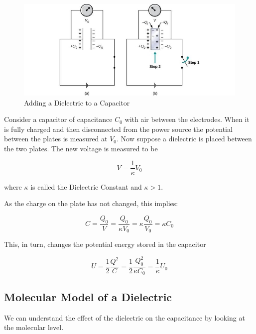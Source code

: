 \documentclass[14pt]{memoir}
\begin{document}
\begin{figure}[H]
\begin{center}
\includegraphics[scale=0.50]{fig/fig_08_17.jpg}
\caption{Adding a Dielectric to a Capacitor}
\label{fig:08_17}
\end{center}
\end{figure}


Consider a capacitor of capacitance $C_0$ with air between the electrodes. When it is fully charged and then disconnected from the power source the potential between the plates is measured at $V_0$. Now suppose a dielectric is placed between the two plates. The new voltage is measured to be

\begin{equation}
V = \frac{1}{\kappa} V_0
\end{equation}

where $\kappa$ is called the Dielectric Constant and $\kappa > 1$.

As the charge on the plate has not changed, this implies:

\begin{equation}
C = \frac{Q_0}{V} = \frac{Q_0}{\kappa V_0} = \kappa \frac{Q_0}{V_0} = \kappa C_0
\end{equation}

This, in turn, changes the potential energy stored in the capacitor

\begin{equation}
U = \frac{1}{2} \frac{Q^2}{C} = \frac{1}{2} \frac{Q_0^2}{\kappa C_0} = \frac{1}{\kappa} U_0
\end{equation}

\subsection{Molecular Model of a Dielectric}

We can understand the effect of the dielectric on the capacitance by looking at the molecular level.
\end{document}
